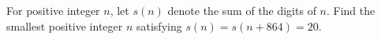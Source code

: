 For positive integer $n$,  let $s(n)$ denote the sum of the digits of $n$. Find the smallest positive integer $n$ satisfying $s(n)=s(n+864)=20$.